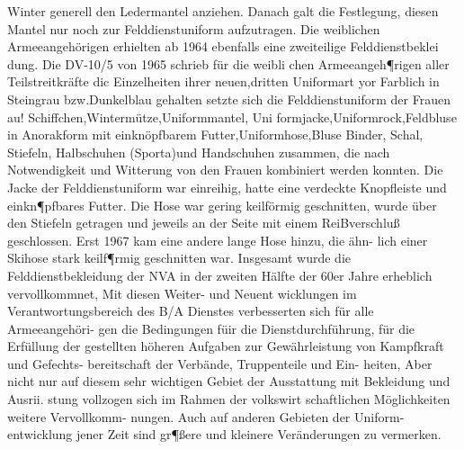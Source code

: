 Winter generell den Ledermantel anziehen. Danach
galt die Festlegung, diesen Mantel nur noch zur
Felddienstuniform aufzutragen.
Die weiblichen Armeeangehörigen erhielten ab
1964 ebenfalls eine zweiteilige Felddienstbeklei
dung. Die DV-10/5 von 1965 schrieb für die weibli
chen Armeeangeh¶rigen aller Teilstreitkräfte dic
Einzelheiten ihrer neuen,dritten Uniformart yor
Farblich in Steingrau bzw.Dunkelblau gehalten
setzte sich die Felddienstuniform der Frauen au!
Schiffchen,Wintermütze,Uniformmantel, Uni
formjacke,Uniformrock,Feldbluse in Anorakform
mit einknöpfbarem Futter,Uniformhose,Bluse Binder, Schal, Stiefeln, Halbschuhen (Sporta)und
Handschuhen zusammen, die nach Notwendigkeit
und Witterung von den Frauen kombiniert werden
konnten.
Die Jacke der Felddienstuniform war einreihig,
hatte eine verdeckte Knopfleiste und einkn¶pfbares
Futter. Die Hose war gering keilförmig geschnitten,
wurde über den Stiefeln getragen und jeweils an der
Seite mit einem ReiBverschluß geschlossen. Erst
1967 kam eine andere lange Hose hinzu, die ähn-
lich einer Skihose stark keilf¶rmig geschnitten war.
Insgesamt wurde die Felddienstbekleidung der
NVA in der zweiten Hälfte der 60er Jahre erheblich
vervollkommnet, Mit diesen Weiter- und Neuent
wicklungen im Verantwortungsbereich des B/A
Dienstes verbesserten sich für alle Armeeangehöri-
gen die Bedingungen füir die Dienstdurchführung,
für die Erfüllung der gestellten höheren Aufgaben
zur Gewährleistung von Kampfkraft und Gefechts-
bereitschaft der Verbände, Truppenteile und Ein-
heiten, Aber nicht nur auf diesem sehr wichtigen
Gebiet der Ausstattung mit Bekleidung und Ausrii.
stung vollzogen sich im Rahmen der volkswirt
schaftlichen Möglichkeiten weitere Vervollkomm-
nungen. Auch auf anderen Gebieten der Uniform-
entwicklung jener Zeit sind gr¶ßere und kleinere
Veränderungen zu vermerken.